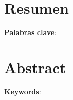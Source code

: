 \chapter*{Resumen}

	\textbf{Palabras clave}: 
	
\paginavacia

\chapter*{Abstract}

	\textbf{Keywords}: 